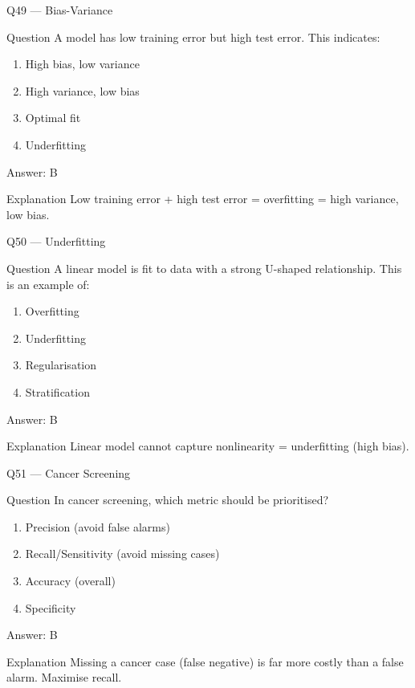 \documentclass[aspectratio=169,8pt]{beamer}
\begin{document}
	\begin{frame}{Q49 --- Bias-Variance}
		\begin{block}{Question}
			A model has low training error but high test error. This indicates:
		\end{block}
		\begin{enumerate}
			\item High bias, low variance
			\item High variance, low bias
			\item Optimal fit
			\item Underfitting
		\end{enumerate}
		\begin{exampleblock}{Answer: B}\end{exampleblock}
		\begin{block}{Explanation}
			Low training error + high test error = overfitting = high variance, low bias.
		\end{block}
	\end{frame}
	
	\begin{frame}{Q50 --- Underfitting}
		\begin{block}{Question}
			A linear model is fit to data with a strong U-shaped relationship. This is an example of:
		\end{block}
		\begin{enumerate}
			\item Overfitting
			\item Underfitting
			\item Regularisation
			\item Stratification
		\end{enumerate}
		\begin{exampleblock}{Answer: B}\end{exampleblock}
		\begin{block}{Explanation}
			Linear model cannot capture nonlinearity = underfitting (high bias).
		\end{block}
	\end{frame}
	
	\begin{frame}{Q51 --- Cancer Screening}
		\begin{block}{Question}
			In cancer screening, which metric should be prioritised?
		\end{block}
		\begin{enumerate}
			\item Precision (avoid false alarms)
			\item Recall/Sensitivity (avoid missing cases)
			\item Accuracy (overall)
			\item Specificity
		\end{enumerate}
		\begin{exampleblock}{Answer: B}\end{exampleblock}
		\begin{block}{Explanation}
			Missing a cancer case (false negative) is far more costly than a false alarm. Maximise recall.
		\end{block}
	\end{frame}
	
\end{document}

